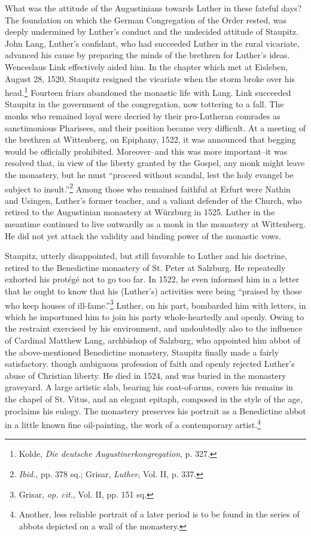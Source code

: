 What was the attitude of the Augustinians towards Luther in these
fateful days? The foundation on which the German Congregation of the Order
rested, was deeply undermined by Luther’s conduct and the undecided attitude
of Staupitz. John Lang, Luther’s
confidant, who had succeeded Luther in the rural vicariate, advanced
his cause by preparing the minds of the brethren for Luther’s ideas.
Wenceslaus Link effectively aided him. In the chapter which met at
Eisleben, August 28, 1520, Staupitz resigned the vicariate when the
storm broke over his head.\footnote{Kolde, \textit{Die deutsche Augustinerkongregation}, p. 327.}
Fourteen friars abandoned the monastic
life with Lang. Link succeeded Staupitz in the government of the
congregation, now tottering to a fall. The monks who remained loyal
were decried by their pro-Lutheran comrades as sanctimonious Pharisees,
and their position became very difficult. At a meeting of the
brethren at Wittenberg, on Epiphany, 1522, it was announced that
begging would be officially prohibited. Moreover--and this was more
important--it was resolved that, in view of the liberty granted by
the Gospel, any monk might leave the monastery, but he must “proceed
without scandal, lest the holy evangel be subject to insult.”\footnote{\textit{Ibid.}, pp. 378 sq.; Grisar, \textit{Luther}, Vol. II, p. 337.}
Among those who remained faithful at Erfurt were Nathin and
Usingen, Luther’s former teacher, and a valiant defender of the
Church, who retired to the Augustinian monastery at Würzburg in
1525. Luther in the meantime continued to live outwardly as a monk
in the monastery at Wittenberg. He did not yet attack the validity
and binding power of the monastic vows.

Staupitz, utterly disappointed, but still favorable to Luther and
his doctrine, retired to the Benedictine monastery of St. Peter at
Salzburg. He repeatedly exhorted his protégé not to go too far. In
1522, he even informed him in a letter that he ought to know that
his (Luther’s) activities were being “praised by those who keep
houses of ill-fame.”\footnote{Grisar, \textit{op. cit.}, Vol. II, pp. 151 sq.}
Luther, on his part, bombarded him with letters, in which he importuned
him to join his party whole-heartedly
and openly. Owing to the restraint exercised by his environment, and
undoubtedly also to the influence of Cardinal Matthew Lang, archbishop
of Salzburg, who appointed him abbot of the above-mentioned
Benedictine monastery, Staupitz finally made a fairly satisfactory.
though ambiguous profession of faith and openly rejected Luther’s
abuse of Christian liberty. He died in 1524, and was buried in the
monastery graveyard. A large artistic slab, bearing his coat-of-arms,
covers his remains in the chapel of St. Vitus, and an elegant epitaph,
composed in the style of the age, proclaims his eulogy. The monastery preserves
his portrait as a Benedictine abbot in a little known
fine oil-painting, the work of a contemporary artist.\footnote
{Another, less reliable portrait of a later period is to be found in the series of abbots
depicted on a wall of the monastery.}

